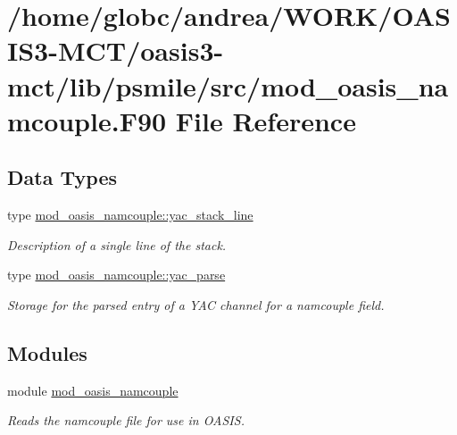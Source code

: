 \hypertarget{mod__oasis__namcouple_8_f90}{}\section{/home/globc/andrea/\+W\+O\+R\+K/\+O\+A\+S\+I\+S3-\/\+M\+C\+T/oasis3-\/mct/lib/psmile/src/mod\+\_\+oasis\+\_\+namcouple.F90 File Reference}
\label{mod__oasis__namcouple_8_f90}
\subsection*{Data Types}
\begin{DoxyCompactItemize}
\item 
type \hyperlink{structmod__oasis__namcouple_1_1yac__stack__line}{mod\+\_\+oasis\+\_\+namcouple\+::yac\+\_\+stack\+\_\+line}
\begin{DoxyCompactList}\small\item\em Description of a single line of the stack. \end{DoxyCompactList}\item 
type \hyperlink{structmod__oasis__namcouple_1_1yac__parse}{mod\+\_\+oasis\+\_\+namcouple\+::yac\+\_\+parse}
\begin{DoxyCompactList}\small\item\em Storage for the parsed entry of a Y\+AC channel for a namcouple field. \end{DoxyCompactList}\end{DoxyCompactItemize}
\subsection*{Modules}
\begin{DoxyCompactItemize}
\item 
module \hyperlink{namespacemod__oasis__namcouple}{mod\+\_\+oasis\+\_\+namcouple}
\begin{DoxyCompactList}\small\item\em Reads the namcouple file for use in O\+A\+S\+IS. \end{DoxyCompactList}\end{DoxyCompactItemize}
